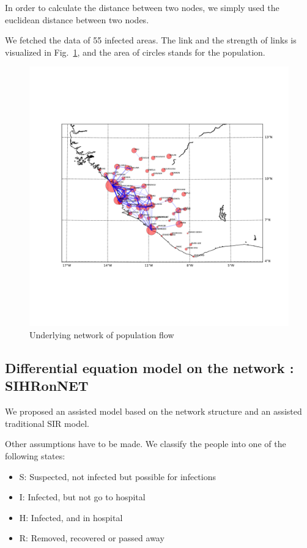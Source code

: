 \documentclass[11pt]{article}
\begin{document}
In order to calculate the distance between two nodes, we simply used the euclidean distance between two nodes.

We fetched the data of 55 infected areas. The link and the strength of links is visualized in Fig.~\ref{network}, and the area of circles stands for the population.

\begin{figure}[hbtp]
\begin{center}
  \includegraphics[width=4.5in]{graph/network2.pdf}
  \caption{Underlying network of population flow}
  \label{network}
\end{center}  
\end{figure}

\subsection{Differential equation model on the network :  SIHRonNET}

We proposed an assisted model based on the network structure and an assisted traditional SIR model.

Other assumptions have to be made. We classify the people into one of the following states:

\begin{itemize}
    \item S: Suspected, not infected but possible for infections
    \item I: Infected, but not go to hospital
    \item H: Infected, and in hospital
    \item R: Removed, recovered or passed away
\end{itemize}
\end{document}
